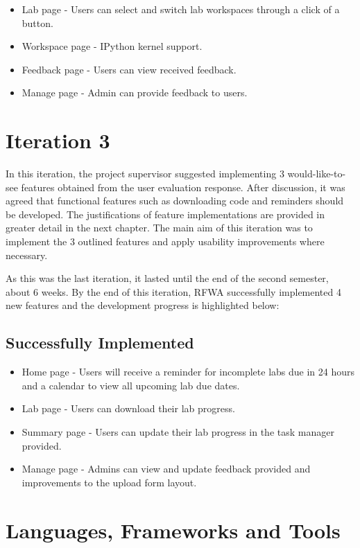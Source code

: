 \documentclass{l4proj}
\begin{document}
\begin{itemize}
    \item
    Lab page - Users can select and switch lab workspaces through a click of a button.
    \item 
    Workspace page - IPython kernel support.
    \item 
    Feedback page - Users can view received feedback.
    \item
    Manage page - Admin can provide feedback to users.
\end{itemize}

\section{Iteration 3}

In this iteration, the project supervisor suggested implementing 3 would-like-to-see features obtained from the user evaluation response. After discussion, it was agreed that functional features such as downloading code and reminders should be developed. The justifications of feature implementations are provided in greater detail in the next chapter. The main aim of this iteration was to implement the 3 outlined features and apply usability improvements where necessary. 

As this was the last iteration, it lasted until the end of the second semester, about 6 weeks. By the end of this iteration, RFWA successfully implemented 4 new features and the development progress is highlighted below:

\subsection{Successfully Implemented}


\begin{itemize}
    \item
    Home page - Users will receive a reminder for incomplete labs due in 24 hours and a calendar to view all upcoming lab due dates.
    \item
    Lab page - Users can download their lab progress.
    \item
    Summary page - Users can update their lab progress in the task manager provided.
    \item 
    Manage page - Admins can view and update feedback provided and improvements to the upload form layout.
\end{itemize}

\section{Languages, Frameworks and Tools}
\end{document}
